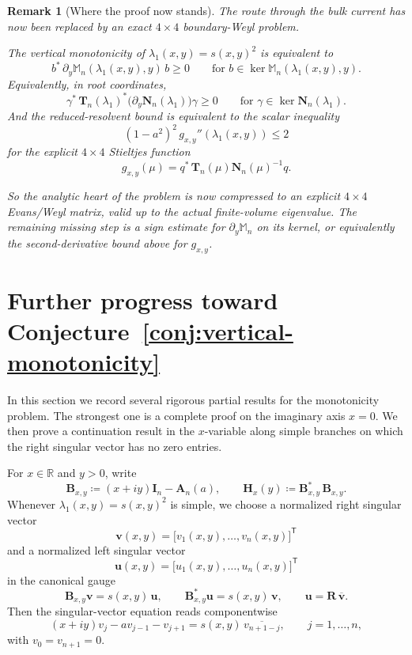 \documentclass[11pt]{article}
\newtheorem{remark}[theorem]{Remark}
\begin{document}
\begin{remark}[Where the proof now stands]
The route through the bulk current has now been replaced by an exact \(4\times4\) boundary-Weyl problem.

\smallskip

\noindent
The vertical monotonicity of \(\lambda_1(x,y)=s(x,y)^2\) is equivalent to
\[
b^*\,\partial_y\mathbb M_n(\lambda_1(x,y),y)\,b\ge 0
\qquad
\text{for }b\in\ker \mathbb M_n(\lambda_1(x,y),y).
\]
Equivalently, in root coordinates,
\[
\gamma^*\,\mathbf T_n(\lambda_1)^*
\bigl(\partial_y\mathbf N_n(\lambda_1)\bigr)\gamma\ge 0
\qquad
\text{for }\gamma\in\ker \mathbf N_n(\lambda_1).
\]
And the reduced-resolvent bound is equivalent to the scalar inequality
\[
(1-a^2)^2\,g_{x,y}''(\lambda_1(x,y))\le 2
\]
for the explicit \(4\times4\) Stieltjes function
\[
g_{x,y}(\mu)=q^*\,\mathbf T_n(\mu)\mathbf N_n(\mu)^{-1}q.
\]

\smallskip

\noindent
So the analytic heart of the problem is now compressed to an explicit \(4\times4\) Evans/Weyl matrix,
valid up to the actual finite-volume eigenvalue. The remaining missing step is a sign estimate for
\(\partial_y\mathbb M_n\) on its kernel, or equivalently the second-derivative bound above for
\(g_{x,y}\).
\end{remark}

\section{Further progress toward Conjecture~\ref{conj:vertical-monotonicity}}

In this section we record several rigorous partial results for the monotonicity problem.  The strongest one is a complete proof on the imaginary axis \(x=0\).  We then prove a continuation result in the \(x\)-variable along simple branches on which the right singular vector has no zero entries.

For \(x\in\mathbb R\) and \(y>0\), write
\[
\mathbf B_{x,y}\coloneqq (x+iy)\mathbf I_n-\mathbf A_n(a),
\qquad
\mathbf H_x(y)\coloneqq \mathbf B_{x,y}^*\,\mathbf B_{x,y}.
\]
Whenever \(\lambda_1(x,y)=s(x,y)^2\) is simple, we choose a normalized right singular vector
\[
\mathbf v(x,y)=\bigl[v_1(x,y),\dots,v_n(x,y)\bigr]^{\mathsf T}
\]
and a normalized left singular vector
\[
\mathbf u(x,y)=\bigl[u_1(x,y),\dots,u_n(x,y)\bigr]^{\mathsf T}
\]
in the canonical gauge
\[
\mathbf B_{x,y}\mathbf v=s(x,y)\,\mathbf u,
\qquad
\mathbf B_{x,y}^*\mathbf u=s(x,y)\,\mathbf v,
\qquad
\mathbf u=\mathbf R\,\overline{\mathbf v}.
\]
Then the singular-vector equation reads componentwise
\[
(x+iy)v_j-a v_{j-1}-v_{j+1}=s(x,y)\,\overline{v_{n+1-j}},
\qquad
j=1,\dots,n,
\]
with \(v_0=v_{n+1}=0\).
\end{document}
